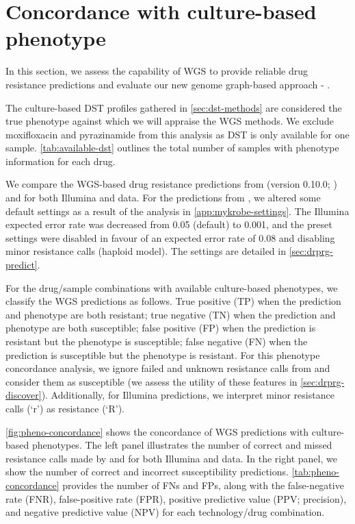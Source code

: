\section{Concordance with culture-based phenotype}
\label{sec:pheno-concordance}

In this section, we assess the capability of \ont{} WGS to provide reliable drug resistance predictions and evaluate our new genome graph-based approach - \drprg{}.

The culture-based DST profiles gathered in \autoref{sec:dst-methods} are considered the true phenotype against which we will appraise the WGS methods. We exclude moxifloxacin and pyrazinamide from this analysis as DST is only available for one sample. \autoref{tab:available-dst} outlines the total number of samples with phenotype information for each drug.

We compare the WGS-based drug resistance predictions from \mykrobe{} (version 0.10.0; \cite{hunt2019}) and \drprg{} for both Illumina and \ont{} data. For the predictions from \mykrobe{}, we altered some default settings as a result of the analysis in \autoref{app:mykrobe-settings}. The Illumina expected error rate was decreased from 0.05 (default) to 0.001, and the preset \ont{} settings were disabled in favour of an expected error rate of 0.08 and disabling minor resistance calls (haploid model). The \drprg{} settings are detailed in \autoref{sec:drprg-predict}. 

For the drug/sample combinations with available culture-based phenotypes, we classify the WGS predictions as follows. True positive (TP) when the prediction and phenotype are both resistant; true negative (TN) when the prediction and phenotype are both susceptible; false positive (FP) when the prediction is resistant but the phenotype is susceptible; false negative (FN) when the prediction is susceptible but the phenotype is resistant. For this phenotype concordance analysis, we ignore failed and unknown resistance calls from \drprg{} and consider them as susceptible (we assess the utility of these features in \autoref{sec:drprg-discover}). Additionally, for \mykrobe{} Illumina predictions, we interpret minor resistance calls (`r') as resistance (`R').

\autoref{fig:pheno-concordance} shows the concordance of WGS predictions with culture-based phenotypes. The left panel illustrates the number of correct and missed resistance calls made by \mykrobe{} and \drprg{} for both Illumina and \ont{} data. In the right panel, we show the number of correct and incorrect susceptibility predictions. \autoref{tab:pheno-concordance} provides the number of FNs and FPs, along with the false-negative rate (FNR), false-positive rate (FPR), positive predictive value (PPV; precision), and negative predictive value (NPV) for each technology/drug combination. 

